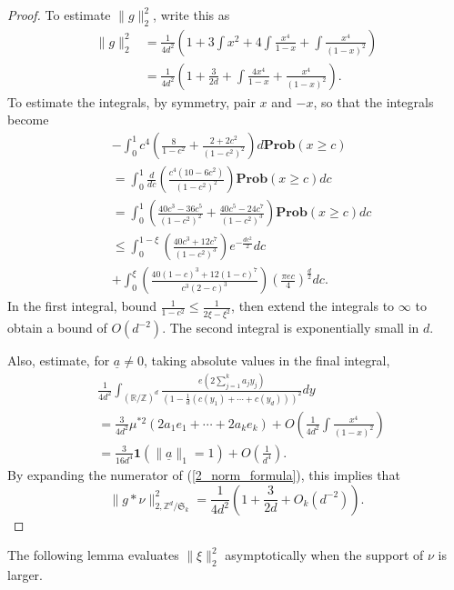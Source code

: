 \documentclass[a4paper, 12pt, notitlepage]{amsart}
\newcommand{\bR}{\mathbb{R}}
\newcommand{\zed}{\mathbb{Z}}
\newcommand{\one}{\mathbf{1}}
\newcommand{\Prob}{\mathbf{Prob}}
\newcommand{\ua}{\underline{a}}
\newcommand{\fS}{{\mathfrak{S}}}
\theoremstyle{remark}
\begin{document}
\begin{proof}
To estimate $\|g\|_{2}^2$, write this as
\begin{align*}
 \|g\|_{2}^2 &= \frac{1}{4d^2} \left(1 + 3 \int x^2 + 4 \int \frac{x^4}{1-x} + \int \frac{x^4}{(1-x)^2} \right)\\
 &= \frac{1}{4d^2} \left(1 + \frac{3}{2d} +   \int \frac{4x^4}{1-x} + \frac{x^4}{(1-x)^2} \right).
\end{align*}
To estimate the integrals, by symmetry, pair $x$ and $-x$, so that the integrals become
\begin{align*}
 &-\int_0^1 c^4\left(\frac{8}{1-c^2} + \frac{2 + 2c^2}{(1-c^2)^2} \right)d\Prob(x \geq c) \\
 &=  \int_0^1 \frac{d}{dc}\left(\frac{c^4 (10-6c^2)}{(1-c^2)^2} \right) \Prob(x\geq c) dc\\
 &=  \int_0^1 \left(\frac{40c^3 -36 c^5}{(1-c^2)^2} + \frac{40c^5 - 24c^7}{(1-c^2)^3} \right)\Prob(x\geq c) dc\\
 & \leq  \int_0^{1-\xi} \left( \frac{40 c^3  + 12 c^7}{(1-c^2)^3} \right)e^{-\frac{dc^2}{2}} dc \\ &+\int_0^{\xi} \left( \frac{40(1-c)^3  + 12(1-c)^7}{c^3 (2-c)^3} \right)\left(\frac{\pi e c}{4} \right)^{\frac{d}{2}} dc.
\end{align*}
In the first integral, bound $\frac{1}{1-c^2} \leq \frac{1}{2\xi - \xi^2}$, then extend the integrals to $\infty$ to obtain a bound of $O(d^{-2})$.  The second integral is exponentially small in $d$.

Also, estimate, for $\ua \neq 0$, taking absolute values in the final integral,
\begin{align*}
& \frac{1}{4d^2} \int_{(\bR/\zed)^d}\frac{e(2\sum_{j=1}^k a_jy_j)}{\left(1-\frac{1}{d}\left(c(y_1)+\cdots + c(y_d) \right) \right)^2}dy \\
&= \frac{3}{4d^2} \mu^{*2}(2a_1 e_1 + \cdots +2a_k e_k) + O\left(\frac{1}{4d^2} \int \frac{x^4}{(1-x)^2} \right)\\
&= \frac{3}{16 d^4} \one(\|\ua\|_1=1) + O\left(\frac{1}{d^4} \right).
\end{align*}
By expanding the numerator of (\ref{2_norm_formula}), this implies that
\begin{equation}
 \|g*\nu\|_{2, \zed^d/\fS_k}^2 = \frac{1}{4d^2} \left(1 + \frac{3}{2d} + O_k(d^{-2})\right).
\end{equation}
\end{proof}

The following lemma evaluates $\|\xi\|_2^2$ asymptotically when the support of $\nu$ is larger.
\end{document}
